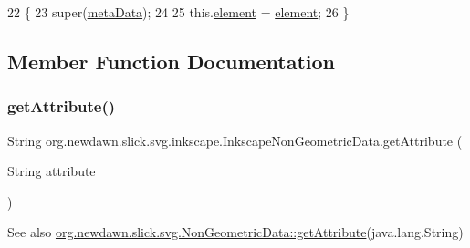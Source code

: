 \begin{DoxyCode}
22                                                                       \{
23         super(\mbox{\hyperlink{classorg_1_1newdawn_1_1slick_1_1svg_1_1_non_geometric_data_ab9720408fbd609767acb6528999a3f8d}{metaData}});
24         
25         this.\mbox{\hyperlink{classorg_1_1newdawn_1_1slick_1_1svg_1_1inkscape_1_1_inkscape_non_geometric_data_a5a9eaa3f1e55ba4c4c37037e1cbd94c1}{element}} = \mbox{\hyperlink{classorg_1_1newdawn_1_1slick_1_1svg_1_1inkscape_1_1_inkscape_non_geometric_data_a5a9eaa3f1e55ba4c4c37037e1cbd94c1}{element}};
26     \}
\end{DoxyCode}


\subsection{Member Function Documentation}
\mbox{\label{classorg_1_1newdawn_1_1slick_1_1svg_1_1inkscape_1_1_inkscape_non_geometric_data_af32f57fe089072927b28408007dfd2eb}} 
\subsubsection{\texorpdfstring{get\+Attribute()}{getAttribute()}}
{\footnotesize\ttfamily String org.\+newdawn.\+slick.\+svg.\+inkscape.\+Inkscape\+Non\+Geometric\+Data.\+get\+Attribute (\begin{DoxyParamCaption}\item[{String}]{attribute }\end{DoxyParamCaption})\hspace{0.3cm}{\ttfamily [inline]}}

\begin{DoxySeeAlso}{See also}
\mbox{\hyperlink{classorg_1_1newdawn_1_1slick_1_1svg_1_1_non_geometric_data_af14f4628737e3da9379ac25e0a56a92d}{org.\+newdawn.\+slick.\+svg.\+Non\+Geometric\+Data\+::get\+Attribute}}(java.\+lang.\+String) 
\end{DoxySeeAlso}

